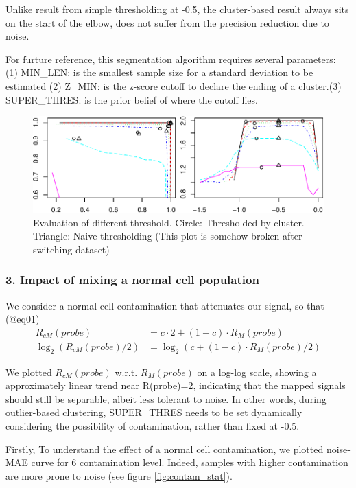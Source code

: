\documentclass[]{article}
\begin{document}
Unlike result from simple thresholding at -0.5, the cluster-based result
always sits on the start of the elbow, does not suffer from the
precision reduction due to noise.

For furture reference, this segmentation algorithm requires several
parameters: (1) MIN\_LEN: is the smallest sample size for a standard
deviation to be estimated (2) Z\_MIN: is the z-score cutoff to declare
the ending of a cluster.(3) SUPER\_THRES: is the prior belief of where
the cutoff lies.

\begin{figure}
\centering
\includegraphics{copynumber_files/figure-latex/plot__PR-1.pdf}
\caption{\label{fig:eval_thres} Evaluation of different threshold.
Circle: Thresholded by cluster. Triangle: Naive thresholding (This plot
is somehow broken after switching dataset)}
\end{figure}

\subsubsection{3. Impact of mixing a normal cell
population}\label{impact-of-mixing-a-normal-cell-population}

We consider a normal cell contamination that attenuates our signal, so
that (@eq01) \[
\begin{aligned}
R_{cM}(probe) &= c \cdot 2 + (1-c) \cdot R_M(probe) \\
\log_{2}{(R_{cM}(probe)/2)} &= \log_{2}{(c+(1-c)\cdot R_M(probe) / 2)}
\end{aligned}
\]

We plotted \(R_{cM}(probe)\) w.r.t. \(R_M(probe)\) on a log-log scale,
showing a approximately linear trend near R(probe)=2, indicating that
the mapped signals should still be separable, albeit less tolerant to
noise. In other words, during outlier-based clustering, SUPER\_THRES
needs to be set dynamically considering the possibility of
contamination, rather than fixed at -0.5.

Firstly, To understand the effect of a normal cell contamination, we
plotted noise-MAE curve for 6 contamination level. Indeed, samples with
higher contamination are more prone to noise (see figure
\ref{fig:contam_stat}).
\end{document}

